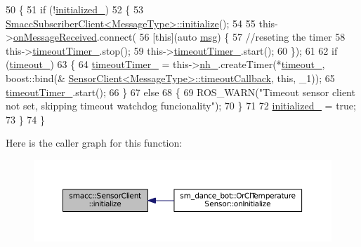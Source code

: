 \begin{DoxyCode}
50   \{
51     \textcolor{keywordflow}{if} (!\hyperlink{classsmacc_1_1SensorClient_a7dde11291a16f6c2edaa02552895ee9e}{initialized\_})
52     \{
53       \hyperlink{classsmacc_1_1SmaccSubscriberClient_acfa97685ecc588fe61eb57002354b58a}{SmaccSubscriberClient<MessageType>::initialize}();
54 
55       this->\hyperlink{classsmacc_1_1SmaccSubscriberClient_a7635fbb013c6fdbc3998da11b44766bb}{onMessageReceived}.connect(
56           [\textcolor{keyword}{this}](\textcolor{keyword}{auto} \hyperlink{namespacekeyboard__node_a768777e12f75b89e4a0a60acf748e9eb}{msg}) \{
57             \textcolor{comment}{//reseting the timer}
58             this->\hyperlink{classsmacc_1_1SensorClient_a5a82e2fa1f0ccfe2564125fae2f9783a}{timeoutTimer\_}.stop();
59             this->\hyperlink{classsmacc_1_1SensorClient_a5a82e2fa1f0ccfe2564125fae2f9783a}{timeoutTimer\_}.start();
60           \});
61 
62       \textcolor{keywordflow}{if} (\hyperlink{classsmacc_1_1SensorClient_a660452b6940625d3c60581961124ebd8}{timeout\_})
63       \{
64         \hyperlink{classsmacc_1_1SensorClient_a5a82e2fa1f0ccfe2564125fae2f9783a}{timeoutTimer\_} = this->\hyperlink{classsmacc_1_1SmaccSubscriberClient_addb62aabc4f81ddac5a151642335ab54}{nh\_}.createTimer(*\hyperlink{classsmacc_1_1SensorClient_a660452b6940625d3c60581961124ebd8}{timeout\_}, boost::bind(&
      \hyperlink{classsmacc_1_1SensorClient_adea5a6e03330691fd0bd30acf1594011}{SensorClient<MessageType>::timeoutCallback}, \textcolor{keyword}{this}, \_1));
65         \hyperlink{classsmacc_1_1SensorClient_a5a82e2fa1f0ccfe2564125fae2f9783a}{timeoutTimer\_}.start();
66       \}
67       \textcolor{keywordflow}{else}
68       \{
69         ROS\_WARN(\textcolor{stringliteral}{"Timeout sensor client not set, skipping timeout watchdog funcionality"});
70       \}
71 
72       \hyperlink{classsmacc_1_1SensorClient_a7dde11291a16f6c2edaa02552895ee9e}{initialized\_} = \textcolor{keyword}{true};
73     \}
74   \}
\end{DoxyCode}


Here is the caller graph for this function\+:
\nopagebreak
\begin{figure}[H]
\begin{center}
\leavevmode
\includegraphics[width=350pt]{classsmacc_1_1SensorClient_aab9ae52c239305f09cfc4aa48e533ef8_icgraph}
\end{center}
\end{figure}


